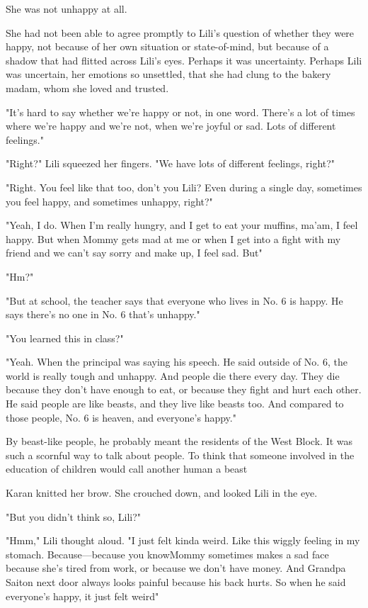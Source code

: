 She was not unhappy at all.

She had not been able to agree promptly to Lili's question of whether
they were happy, not because of her own situation or state-of-mind, but
because of a shadow that had flitted across Lili's eyes. Perhaps it was
uncertainty. Perhaps Lili was uncertain, her emotions so unsettled, that
she had clung to the bakery madam, whom she loved and trusted.

"It's hard to say whether we're happy or not, in one word. There's a lot
of times where we're happy and we're not, when we're joyful or sad. Lots
of different feelings."

"Right?" Lili squeezed her fingers. "We have lots of different feelings,
right?"

"Right. You feel like that too, don't you Lili? Even during a single
day, sometimes you feel happy, and sometimes unhappy, right?"

"Yeah, I do. When I'm really hungry, and I get to eat your muffins,
ma'am, I feel happy. But when Mommy gets mad at me or when I get into a
fight with my friend and we can't say sorry and make up, I feel sad.
But\el "

"Hm?"

"But at school, the teacher says that everyone who lives in No. 6 is
happy. He says there's no one in No. 6 that's unhappy."

"You learned this in class?"

"Yeah. When the principal was saying his speech. He said outside of No.
6, the world is really tough and unhappy. And people die there every
day. They die because they don't have enough to eat, or because they
fight and hurt each other. He said people are like beasts, and they live
like beasts too. And compared to those people, No. 6 is heaven, and
everyone's happy."

By beast-like people, he probably meant the residents of the West Block.
It was such a scornful way to talk about people. To think that someone
involved in the education of children would call another human a
beast\el 

Karan knitted her brow. She crouched down, and looked Lili in the eye.

"But you didn't think so, Lili?"

"Hmm," Lili thought aloud. "I just felt kinda weird. Like this wiggly
feeling in my stomach. Because---because you know\el Mommy sometimes makes
a sad face because she's tired from work, or because we don't have
money. And Grandpa Saiton next door always looks painful because his
back hurts. So when he said everyone's happy, it just felt weird\el "

